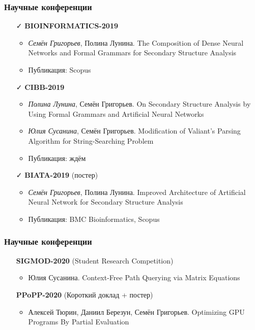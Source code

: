 \documentclass[xcolor=table]{beamer}
\begin{document}
\begin{frame}[fragile]

  \frametitle{Научные конференции}
      \begin{itemize}

      \item[\faCheck] \textbf{BIOINFORMATICS-2019}
      \begin{itemize}
        \item \emph{Семён Григорьев}, Полина Лунина. The Composition of Dense Neural Networks and Formal Grammars for Secondary Structure Analysis
        \item Публикация: Scopus
      \end{itemize}

      \item[\faCheck] \textbf{CIBB-2019}
      \begin{itemize}
        \item \emph{Полина Лунина}, Семён Григорьев. On Secondary Structure Analysis by Using Formal Grammars and Artificial Neural Networks
        \item \emph{Юлия Сусанина}, Семён Григорьев. Modification of Valiant’s Parsing Algorithm for String-Searching Problem
        \item Публикация: ждём
      \end{itemize}

      \item[\faCheck] \textbf{BIATA-2019} (постер)
      \begin{itemize}
         \item \emph{Семён Григорьев}, Полина Лунина. Improved Architecture of Artificial Neural Network for Secondary Structure Analysis
         \item Публикация: BMC Bioinformatics, Scopus
      \end{itemize}

\end{itemize}
\end{frame}

\begin{frame}[fragile]

  \frametitle{Научные конференции}
\begin{itemize}

      \item[\faHourglassHalf] \textbf{SIGMOD-2020} (Student Research Competition)
      \begin{itemize}
        \item Юлия Сусанина. Context-Free Path Querying via Matrix Equations
      \end{itemize}

      \item[\faHourglassHalf] \textbf{PPoPP-2020} (Короткий доклад + постер)
      \begin{itemize}
        \item Алексей Тюрин, Даниил Березун, Семён Григорьев. Optimizing GPU Programs By Partial Evaluation
      \end{itemize}

    \end{itemize}
    \end{frame}
\end{document}
